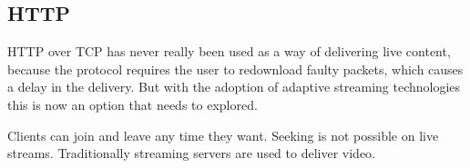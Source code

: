 \subsection{HTTP}
HTTP over TCP has never really been used as a way of delivering live content, because the protocol requires the user to redownload faulty packets, which causes a delay in the delivery. But with the adoption of adaptive streaming technologies this is now an option that needs to explored.

Clients can join and leave any time they want. Seeking is not possible on live streams. Traditionally streaming servers are used to deliver video. 